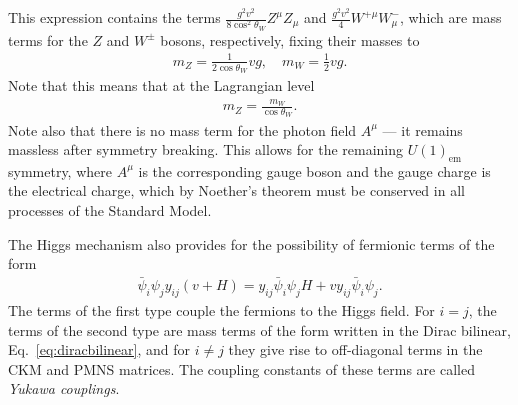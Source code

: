 \documentclass[twoside,english]{uiofysmaster}
\begin{document}
This expression contains the terms $\frac{g^2v^2}{8\cos^2\theta_W} Z^\mu Z_\mu$ and $\frac{g^2v^2}{4} W^{+\mu} W^-_\mu$, which are mass terms for the $Z$ and $W^\pm$ bosons, respectively, fixing their masses to
\begin{align}
	m_Z = \frac{1}{2\cos\theta_W}vg, \quad m_W = \frac{1}{2}vg.
\end{align}
Note that this means that at the Lagrangian level
\begin{align}
	m_Z = \frac{m_W}{\cos\theta_W}.
\end{align}
Note also that there is no mass term for the photon field $A^\mu$ --- it remains massless after symmetry breaking. This allows for the remaining $U(1)_\mathrm{em}$ symmetry, where $A^\mu$ is the corresponding gauge boson and the gauge charge is the electrical charge, which by Noether's theorem must be conserved in all processes of the Standard Model.

The Higgs mechanism also provides for the possibility of fermionic terms of the form 
\begin{align}
 	\bar\psi_i \psi_j y_{ij}(v+H) = y_{ij} \bar \psi_i  \psi_j H + v y_{ij} \bar\psi_i \psi_j.
 \end{align} 
 The terms of the first type couple the fermions to the Higgs field. For $i=j$, the terms of the second type are mass terms of the form written in the Dirac bilinear, Eq.\ \eqref{eq:diracbilinear}, and for $i\neq j$ they give rise to off-diagonal terms in the CKM and PMNS matrices. The coupling constants of these terms are called {\it Yukawa couplings}.
\end{document}
